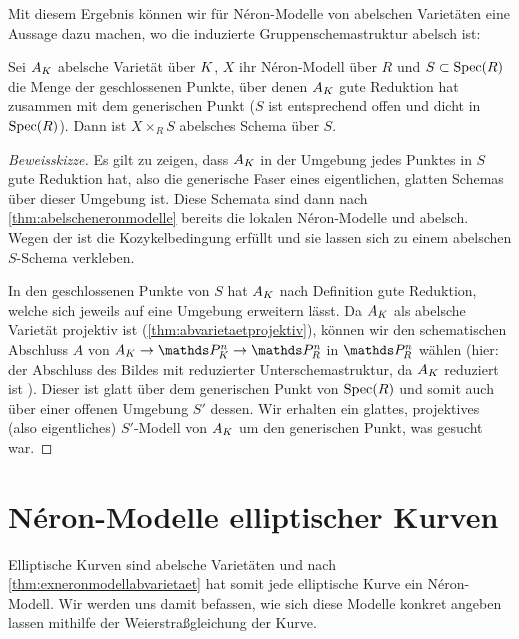 \documentclass[german]{scrreprt}
\begin{document}
Mit diesem Ergebnis können wir für Néron-Modelle von
abelschen Varietäten eine Aussage dazu machen, wo die induzierte
Gruppenschemastruktur abelsch ist:
\begin{Satz}
  Sei $A_{K}$ abelsche Varietät über $K$,
  $X$ ihr Néron-Modell über $R$ und
  $S\subset\operatorname{Spec}(R)$ die Menge der geschlossenen Punkte, über denen
  $A_{K}$ gute Reduktion hat zusammen mit dem generischen Punkt
  ($S$ ist entsprechend offen und dicht in $\operatorname{Spec}(R)$).
  Dann ist $X\times_R S$ abelsches Schema über $S$.
  \cite[1.4, Theorem 3]{neron}
  \begin{proof}[Beweisskizze]
    Es gilt zu zeigen, dass $A_{K}$ in der Umgebung jedes Punktes in
    $S$ gute Reduktion hat, also die generische Faser eines
    eigentlichen, glatten Schemas über dieser Umgebung ist.
    Diese Schemata sind dann nach \autoref{thm:abelscheneronmodelle}
    bereits die lokalen Néron-Modelle und abelsch.
    Wegen der \NAbbEig ist die Kozykelbedingung
    erfüllt und sie lassen sich zu einem abelschen $S$-Schema
    verkleben.

    In den geschlossenen Punkte von $S$ hat $A_{K}$ nach Definition
    gute Reduktion, welche sich jeweils auf eine Umgebung erweitern
    lässt.
    Da $A_{K}$ als abelsche Varietät projektiv ist
    (\autoref{thm:abvarietaetprojektiv}), können wir den schematischen
    Abschluss $A$ von $A_\K\to\P_\K^n\to\P_R^n$ in $\P_R^n$ wählen
    (hier: der Abschluss des Bildes mit reduzierter
    Unterschemastruktur, da $A_{K}$ reduziert ist
    \cite[Remark 10.32]{wedhorn}).
    Dieser ist glatt über dem generischen Punkt von $\operatorname{Spec}(R)$
    und somit auch über einer offenen Umgebung $S'$ dessen.
    Wir erhalten ein glattes, projektives (also eigentliches)
    $S'$-Modell von $A_{K}$ um den generischen Punkt, was gesucht war.
  \end{proof}
\end{Satz}


\section{Néron-Modelle elliptischer Kurven}
Elliptische Kurven sind abelsche Varietäten und nach
\autoref{thm:exneronmodellabvarietaet} hat somit jede elliptische
Kurve ein Néron-Modell. Wir werden uns damit befassen, wie sich diese
Modelle konkret angeben lassen mithilfe der Weierstraßgleichung der
Kurve.
\end{document}
